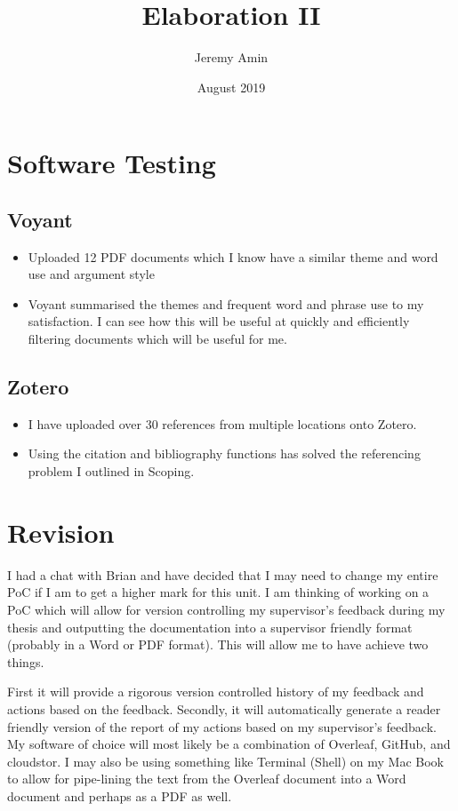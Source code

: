 \documentclass{article}
\title{Elaboration II}
\author{Jeremy Amin}
\date{August 2019}
\begin{document}
\maketitle

\tableofcontents

\section{Software Testing}

\subsection{Voyant}

\begin{itemize}
    \item Uploaded 12 PDF documents which I know have a similar theme and word use and argument style
    \item Voyant summarised the themes and frequent word and phrase use to my satisfaction. I can see how this will be useful at quickly and efficiently filtering documents which will be useful for me.
    \end{itemize}
    
\subsection{Zotero}
\begin{itemize}
    \item I have uploaded over 30 references from multiple locations onto Zotero.
    \item Using the citation and bibliography functions has solved the referencing problem I outlined in Scoping.
\end{itemize}

\section{Revision}

I had a chat with Brian and have decided that I may need to change my entire PoC if I am to get a higher mark for this unit. I am thinking of working on a PoC which will allow for version controlling my supervisor's feedback during my thesis and outputting the documentation into a supervisor friendly format (probably in a Word or PDF format). This will allow me to have achieve two things. 

First it will provide a rigorous version controlled history of my feedback and actions based on the feedback. Secondly, it will automatically generate a reader friendly version of the report of my actions based on my supervisor's feedback. My software of choice will most likely be a combination of Overleaf, GitHub, and cloudstor. I may also be using something like Terminal (Shell) on my Mac Book to allow for pipe-lining the text from the Overleaf document into a Word document and perhaps as a PDF as well.
\end{document}
